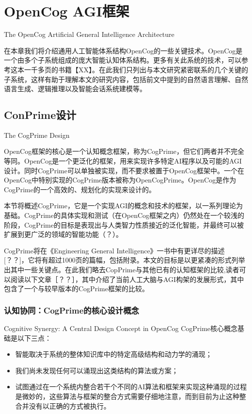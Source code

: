 \chapter{OpenCog AGI框架}{The OpenCog Artificial General Intelligence Architecture}

在本章我们将介绍通用人工智能体系结构OpenCog的一些关键技术。OpenCog是一个由多个子系统组成的庞大智能认知体系结构。更多有关此系统的技术，可以参考这本一千多页的书籍【XX】。在此我们只列出与本文研究紧密联系的几个关键的子系统，这样有助于理解本文的研究内容，包括前文中提到的自然语言理解、自然语言生成、逻辑推理以及智能会话系统建模等。
\section{ConPrime设计}{The CogPrime Design}

\indent OpenCog框架的核心是一个认知概念框架，称为CogPrime，但它们两者并不完全等同。OpenCog是一个更泛化的框架，用来实现许多特定AI程序以及可能的AGI设计。同时CogPrime可以单独被实现，而不要求被置于OpenCog框架中。一个在OpenCog中特别实现的CogPrime版本被称为OpenCogPrime。OpenCog是作为CogPrime的一个高效的、规划化的实现来设计的。

本节将概述CogPrime，它是一个实现AGI的概念和技术的框架，以一系列理论为基础。CogPrime的具体实现和测试（在OpenCog框架之内）仍然处在一个较浅的阶段，CogPrime的目标是表现出与人类智力性质接近的泛化智能，并最终可以被扩展到更广泛的领域的智能功能（？）。

CogPrime将在《Engineering General Intelligence》一书中有更详尽的描述[？？]，它将有超过1000页的篇幅，包括附录。本文的目标是以更紧凑的形式列举出其中一些关键点。在此我们略去CopPrime与其他已有的认知框架的比较,读者可以阅读以下文章［？？］，其中介绍了当前人工大脑与AGI构架的发展形式，其中包含了一个与较早版本的CogPrime框架的比较。

\subsection{认知协同：CogPrime的核心设计概念}{Cognitive Synergy: A Central Design Concept in OpenCog}
\indent CogPrime核心概念基础是以下三点：
\begin{itemize}
  \item 智能取决于系统的整体知识库中的特定高级结构和动力学的涌现；
  \item 我们尚未发现任何可以涌现出这类结构的算法或方案；
  \item 试图通过在一个系统内整合若干个不同的AI算法和框架来实现这种涌现的过程是微妙的，这些算法与框架的整合方式需要仔细地注意，而到目前为止这种整合并没有以正确的方式被执行。
\end{itemize}

